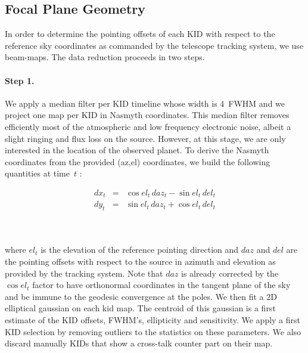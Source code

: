 %
%
%


\subsection{Focal Plane Geometry}

In order to determine the pointing offsets of each KID with respect to the reference sky
coordinates as commanded by the telescope tracking system, we use beam-maps. 
The data reduction proceeds in two steps.

\paragraph{Step 1.} We apply a median filter per
KID timeline whose width is 4~FWHM and we project one map per KID in Nasmyth
coordinates. This median filter removes efficiently most of the atmospheric and low frequency
electronic noise, albeit a slight ringing and flux loss on the
source. However, at this stage, we are only interested in the location of the
observed planet. To derive the Nasmyth coordinates from the provided (az,el)
coordinates, we build the following quantities at time~$t$ :

\begin{eqnarray}
dx_t &=& \cos el_t\, daz_t - \sin el_t\, del_t \nonumber \\
dy_t &=& \sin el_t\, daz_t + \cos el_t\, del_t \nonumber
\end{eqnarray}

\\
\\


where $el_t$ is the elevation of the reference pointing direction and $daz$ and
$del$ are the pointing offsets with respect to the source in azimuth and elevation as
provided by the tracking system. Note that $daz$ is already corrected by the
$\cos el_t$ factor to have orthonormal coordinates in the tangent plane of the sky
and be immune to the geodesic convergence at the poles. We then fit a 2D
elliptical gaussian on each kid map. The centroid of this gaussian is a first
estimate of the KID offsets, FWHM's, ellipticity and sensitivity. We apply a
first KID selection by removing outliers to the statistics on these
parameters. We also discard manually KIDs that show a cross-talk counter part on
their map. 

